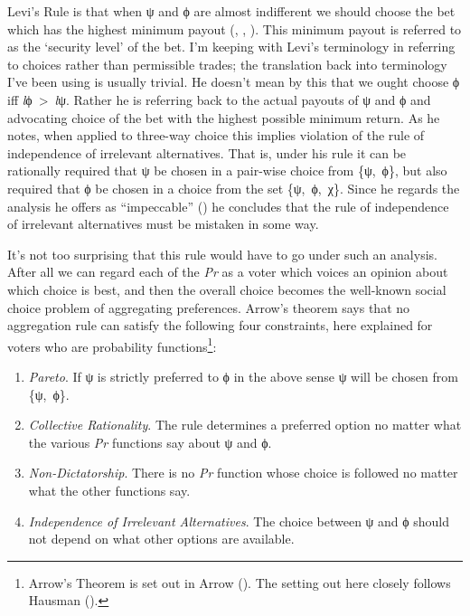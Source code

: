 \documentclass[
  10pt,
  letterpaper,
  DIV=11,
  numbers=noendperiod,
  twoside]{scrartcl}
\providecommand{\tightlist}{%
  \setlength{\itemsep}{0pt}\setlength{\parskip}{0pt}}\usepackage{longtable,booktabs,array}
\begin{document}
Levi's Rule is that when ψ and ϕ are almost indifferent we should choose
the bet which has the highest minimum payout
(, ,
). This minimum payout is referred to as
the `security level' of the bet. I'm keeping with Levi's terminology in
referring to choices rather than permissible trades; the translation
back into terminology I've been using is usually trivial. He doesn't
mean by this that we ought choose ϕ iff
\emph{l}ϕ~\textgreater~\emph{l}ψ. Rather he is referring back to the
actual payouts of ψ and ϕ and advocating choice of the bet with the
highest possible minimum return. As he notes, when applied to three-way
choice this implies violation of the rule of independence of irrelevant
alternatives. That is, under his rule it can be rationally required that
ψ be chosen in a pair-wise choice from \{ψ,~ϕ\}, but also required that
ϕ be chosen in a choice from the set \{ψ,~ϕ,~χ\}. Since he regards the
analysis he offers as ``impeccable'' () he concludes that the rule of independence of irrelevant
alternatives must be mistaken in some way.

It's not too surprising that this rule would have to go under such an
analysis. After all we can regard each of the \emph{Pr} as a voter which
voices an opinion about which choice is best, and then the overall
choice becomes the well-known social choice problem of aggregating
preferences. Arrow's theorem says that no aggregation rule can satisfy
the following four constraints, here explained for voters who are
probability functions\footnote{Arrow's Theorem is set out in Arrow
  (). The setting out here closely follows
  Hausman ().}:

\begin{enumerate}
\def\labelenumi{\arabic{enumi}.}
\tightlist
\item
  \emph{Pareto}. If ψ is strictly preferred to ϕ in the above sense ψ
  will be chosen from \{ψ,~ϕ\}.
\item
  \emph{Collective Rationality}. The rule determines a preferred option
  no matter what the various \emph{Pr} functions say about ψ and ϕ.
\item
  \emph{Non-Dictatorship}. There is no \emph{Pr} function whose choice
  is followed no matter what the other functions say.
\item
  \emph{Independence of Irrelevant Alternatives}. The choice between ψ
  and ϕ should not depend on what other options are available.
\end{enumerate}
\end{document}
